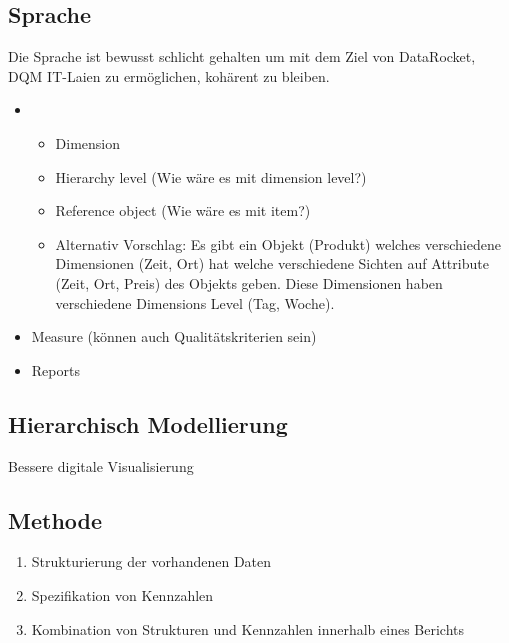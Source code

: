 \documentclass[
  language=german, %
  type=bachelor%
]{isthesis}
\begin{document}
\begin{content}
  \subsection{Sprache}
  \begin{figure}[caption={Relationship of students and theses}, label={fig:img01}]
    \resizebox{\columnwidth}{!}{}
  \end{figure}
  Die Sprache ist bewusst schlicht gehalten um mit dem Ziel von DataRocket, \acrshort{DQM}
  IT-Laien zu ermöglichen, kohärent zu bleiben.
  \begin{itemize}
    \item {}
      \begin{itemize}
        \item Dimension
        \item Hierarchy level (Wie wäre es mit dimension level?)
        \item Reference object (Wie wäre es mit item?)
        \item Alternativ Vorschlag: Es gibt ein Objekt (Produkt) welches verschiedene Dimensionen
          (Zeit, Ort) hat welche verschiedene Sichten auf Attribute (Zeit, Ort,
          Preis) des Objekts geben. Diese Dimensionen haben verschiedene
          Dimensions Level (Tag, Woche).
      \end{itemize}
    \item Measure (können auch Qualitätskriterien sein)
    \item Reports 
  \end{itemize}

  \subsection{Hierarchisch Modellierung}
  Bessere digitale Visualisierung~\citep[][S. 6 f.]{fleischer2013konstruktion}

  \subsection{Methode}
  \begin{enumerate}
    \item Strukturierung der vorhandenen Daten
    \item Spezifikation von Kennzahlen
    \item Kombination von Strukturen und Kennzahlen innerhalb eines Berichts
  \end{enumerate}



\end{content}
\end{document}
